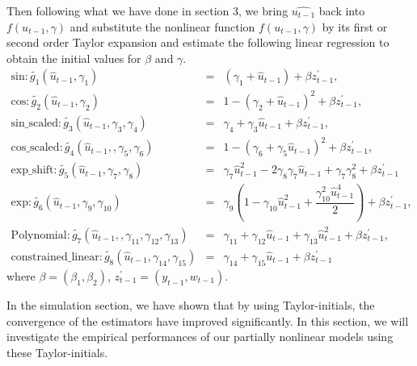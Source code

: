 \documentclass[a4paper,12pt,times,numbered,print,index]{report}
\numberwithin{equation}{section}
\begin{document}
Then following what we have done in section 3, we bring $\hat{u_{t-1}}$ back into $f\left( u_{t-1},\gamma \right)$ and substitute the nonlinear function $f\left( u_{t-1},\gamma \right)$ by its first or second order Taylor expansion and estimate the following linear regression to obtain the initial values for $\beta$ and $\gamma$.
\begin{eqnarray*}
	\text{sin}: \tilde{g_{1}}\left( \hat{u}_{t-1},\gamma _{1}\right) &=& \left( \gamma_{1} +\hat{u}_{t-1}\right) + \beta z_{t-1}^{\prime},  \\
	\text{cos}: \tilde{g_{2}}\left( \hat{u}_{t-1},\gamma _{2}\right) &=& 1 - \left( \gamma_{2} + \hat{u}_{t-1}\right)^2  + \beta z_{t-1}^{\prime}, \\
	\text{sin\_scaled}: \tilde{g_{3}}\left( \hat{u}_{t-1},\gamma_{3},\gamma_{4}\right) &=& \gamma_{4}  + \gamma_{3}\hat{u}_{t-1} + \beta z_{t-1}^{\prime},  \\
	\text{cos\_scaled}: \tilde{g_{4}}\left( \hat{u}_{t-1},,\gamma_{5},\gamma_{6}\right) &=& 1 - \left( \gamma_{6} + \gamma_{5}\hat{u}_{t-1}\right)^2  + \beta z_{t-1}^{\prime}, \\
	\text{exp\_shift}: \tilde{g_{5}}\left( \hat{u}_{t-1},\gamma_{7},\gamma_{8}\right) &=&  \gamma_{7}\hat{u}_{t-1}^2 - 2\gamma_{8}\gamma_{7}\hat{u}_{t-1} + \gamma_{7}\gamma_{8}^2 + \beta z_{t-1}^{\prime} \\
	\text{exp}: \tilde{g_{6}}\left( \hat{u}_{t-1},\gamma_{9},\gamma_{10}\right) &=&  \gamma_{9}(1-\gamma_{10}\hat{u}_{t-1}^2 + \dfrac{\gamma_{10}^2 \hat{u}_{t-1}^4}{2}) + \beta z_{t-1}^{\prime}, \\
	\text{Polynomial}: \tilde{g_{7}}\left( \hat{u}_{t-1},,\gamma_{11},\gamma_{12},\gamma_{13}\right) &=& \gamma_{11}+ \gamma_{12}\hat{u}_{t-1}+\gamma_{13}\hat{u}_{t-1}^{2}+\beta z_{t-1}^{\prime}, \\
	\text{constrained\_linear}: \tilde{g_{8}}\left( \hat{u}_{t-1},\gamma_{14}, \gamma_{15}\right) &=& \gamma_{14}+ \gamma_{15}\hat{u}_{t-1}+\beta z_{t-1}^{\prime}
\end{eqnarray*}%
where $\beta = (\beta_{1}, \beta_{2})$, $ z_{t-1}^{\prime } = (y_{t-1}, w_{t-1})$.

In the simulation section, we have shown that by using Taylor-initials, the convergence of the estimators have improved significantly. In this section, we will investigate the empirical performances of our partially nonlinear models using these Taylor-initials.

\end{document}
